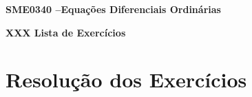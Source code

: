 \documentclass[oneside,12pt,a4paper]{report}
\begin{document}
    \begin{center}
        \fontsize{17.28}{17.28}
            \textbf{SME0340 --Equações Diferenciais Ordinárias}

            \textbf{XXX Lista de Exercícios}
    \end{center}



     \begin{itensquestao}[3]
            \item 
            \item 
            \item
        \end{itensquestao}


\chapter*{Resolução dos Exercícios}
        
    \begin{resolucao}
        \itemresolucao
        
        \itemresolucao 
    \end{resolucao}
\end{document}
